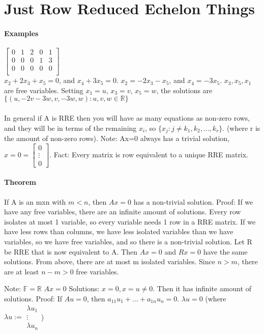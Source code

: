 \documentclass{article}
\begin{document}
\section*{Just Row Reduced Echelon Things}

\paragraph*{Examples}
 $\begin{bmatrix}
    0 & 1 & 2 & 0 & 1 \\
    0 & 0 & 0 & 1 & 3 \\
    0 & 0 & 0 & 0 & 0 \\  
\end{bmatrix}$ \\ 
$x_2+2x_3+x_5=0$, and $x_4+3x_5=0$. $x_2 = -2x_3-x_5$, and $x_4 = -3x_5$. $x_3,x_5,x_1$ are free variables. Setting $x_1=u$, $x_3=v$, $x_5=w$, the solutions are $\{(u,-2v-3w,v,-3w,w):u,v,w\in\mathbb{R}\}$ 

\paragraph{}
In general if A is RRE then you will have as many equations as non-zero rows, and they will be in terms of the remaining $x_i$, so $\{x_j: j \neq k_1,k_2,\ldots,k_r\}$. (where r is the amount of non-zero rows). Note: Ax=0 always has a trivial solution, $x=0=\begin{bmatrix}0\\ \vdots \\ 0\end{bmatrix}$. Fact: Every matrix is row equivalent to a unique RRE matrix. 

\paragraph{Theorem}
If A is an mxn with $m<n$, then $Ax=0$ has a non-trivial solution. Proof: If we have any free variables, there are an infinite amount of solutions. Every row isolates at most 1 variable, so every variable needs 1 row in a RRE matrix. If we have less rows than columns, we have less isolated variables than we have variables, so we have free variables, and so there is a non-trivial solution.
Let R be RRE that is now equivalent to A. Then $Ax=0$ and $Rx=0$ have the same solutions. From above, there are at most m isolated variables. Since $n>m$, there are at least $n-m>0$ free variables. 


Note: 
$\mathbb{F}=\mathbb{R}$ $Ax=0$ Solutions: $x=0, x=u\neq0$. Then it has infinite amount of solutions. Proof: If $Au=0$, then $a_{11}u_1+...+a_{1n}u_n=0$. $\lambda u=0$ (where $\lambda u := \begin{matrix}\lambda u_1\\\vdots\\\lambda u_n\end{matrix}$) 
\end{document}
